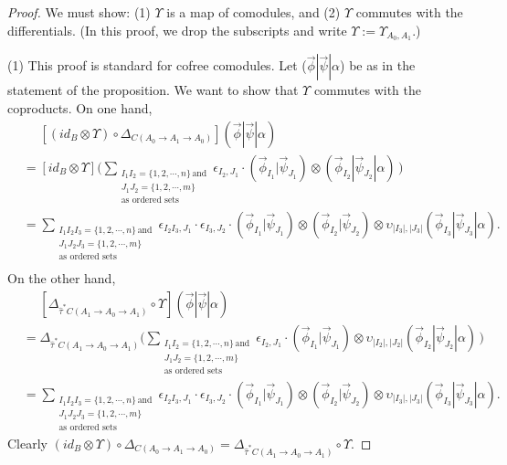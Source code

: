 \begin{proof}
We must show: (1) $\Upsilon$ is a map of comodules, and 
(2) $\Upsilon$ commutes with the differentials. (In this 
proof, we drop the subscripts and write 
$\Upsilon := \Upsilon_{A_0, A_1}$.)

(1) This proof is standard for cofree comodules. 
Let ($\vec{\phi} | \vec{\psi} | \alpha$) be as 
in the statement of the proposition. We want to 
show that $\Upsilon$ commutes with the coproducts. 
On one hand,
\begin{align*}
&\phantom{{}={}}
[(id_B \otimes \Upsilon) \circ 
  \Delta_{C(A_0 \to A_1 \to A_0)}] 
  ( \vec{\phi} | \vec{\psi} | \alpha ) \\
&= [id_B \otimes \Upsilon]
	\big( \sum_{\substack{I_1I_2 = \{1,2,\cdots,n\} \, \textrm{and} \\ 
						  J_1J_2 = \{1,2,\cdots,m\} \\
				          \textrm{as ordered sets}}} 
    \epsilon_{I_2,J_1}\cdot 
    (\vec{\phi}_{I_1} | \vec{\psi}_{J_1}) \otimes (\vec{\phi}_{I_2} | \vec{\psi}_{J_2} | \alpha) \, \big) \\
&= \sum_{\substack{I_1I_2I_3 = \{1,2,\cdots,n\} \, \textrm{and} \\ 
				   J_1J_2J_3 = \{1,2,\cdots,m\} \\
				   \textrm{as ordered sets}}} 
    \epsilon_{I_2I_3,J_1}\cdot \epsilon_{I_3,J_2}\cdot
    (\vec{\phi}_{I_1} | \vec{\psi}_{J_1}) \otimes 
    (\vec{\phi}_{I_2} | \vec{\psi}_{J_2}) \otimes 
    \upsilon_{|I_3|,|J_3|}(\vec{\phi}_{I_3} | \vec{\psi}_{J_3} | \alpha). \\
\end{align*}
On the other hand,
\begin{align*}
&\phantom{{}={}}
[\Delta_{\hat{\tau}^*C(A_1 \to A_0 \to A_1)} 
  \circ \Upsilon ]
  ( \vec{\phi} | \vec{\psi} | \alpha ) \\
&= \Delta_{\hat{\tau}^*C(A_1 \to A_0 \to A_1)}
	\big( \sum_{\substack{I_1I_2 = \{1,2,\cdots,n\} \, \textrm{and} \\ 
						  J_1J_2 = \{1,2,\cdots,m\} \\
				          \textrm{as ordered sets}}}
	\epsilon_{I_2,J_1} \cdot 
  (\vec{\phi}_{I_1} | \vec{\psi}_{J_1}) \otimes 
    \upsilon_{|I_2|,|J_2|}(\vec{\phi}_{I_2} | \vec{\psi}_{J_2} | \alpha) \, \big)\\
&= \sum_{\substack{I_1I_2I_3 = \{1,2,\cdots,n\} \, \textrm{and} \\ 
				   J_1J_2J_3 = \{1,2,\cdots,m\} \\
				   \textrm{as ordered sets}}} 
    \epsilon_{I_2I_3,J_1}\cdot \epsilon_{I_3,J_2}\cdot
    (\vec{\phi}_{I_1} | \vec{\psi}_{J_1}) \otimes 
    (\vec{\phi}_{I_2} | \vec{\psi}_{J_2}) \otimes 
    \upsilon_{|I_3|,|J_3|}(\vec{\phi}_{I_3} | \vec{\psi}_{J_3} | \alpha).   				          
\end{align*}
Clearly 
$(id_B \otimes \Upsilon) \circ 
\Delta_{C(A_0 \to A_1 \to A_0)} = 
\Delta_{\hat{\tau}^*C(A_1 \to A_0 \to A_1)} 
\circ \Upsilon$.


\end{proof}

